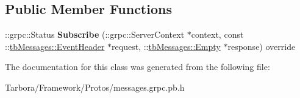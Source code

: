 \subsection*{Public Member Functions}
\begin{DoxyCompactItemize}
\item 
\mbox{\label{classtbMessages_1_1TarboraMessages_1_1WithGenericMethod__Subscribe_aa5d21e4e7dcded4137601080c1547d30}} 
\+::grpc\+::\+Status {\bfseries Subscribe} (\+::grpc\+::\+Server\+Context $\ast$context, const \+::\hyperlink{classtbMessages_1_1EventHeader}{tb\+Messages\+::\+Event\+Header} $\ast$request, \+::\hyperlink{classtbMessages_1_1Empty}{tb\+Messages\+::\+Empty} $\ast$response) override
\end{DoxyCompactItemize}


The documentation for this class was generated from the following file\+:\begin{DoxyCompactItemize}
\item 
Tarbora/\+Framework/\+Protos/messages.\+grpc.\+pb.\+h\end{DoxyCompactItemize}

